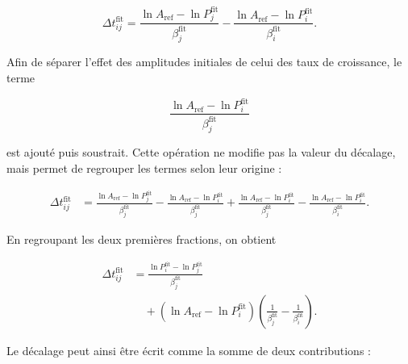 \documentclass[
    11pt,
    a4paper
]{article}
\begin{document}
\begin{equation}
    \Delta t_{ij}^{\mathrm{fit}}
    =
    \frac{
        \ln A_{\mathrm{ref}}
        -
        \ln P_j^{\mathrm{fit}}
    }{
        \beta_j^{\mathrm{fit}}
    }
    -
    \frac{
        \ln A_{\mathrm{ref}}
        -
        \ln P_i^{\mathrm{fit}}
    }{
        \beta_i^{\mathrm{fit}}
    }.
    \label{eq:dt-fit-general-rappel}
\end{equation}

Afin de séparer l’effet des amplitudes initiales de celui des taux de
croissance, le terme

\begin{equation}
    \frac{
        \ln A_{\mathrm{ref}}
        -
        \ln P_i^{\mathrm{fit}}
    }{
        \beta_j^{\mathrm{fit}}
    }
\end{equation}

est ajouté puis soustrait. Cette opération ne modifie pas la valeur du
décalage, mais permet de regrouper les termes selon leur origine :

\begin{align}
    \Delta t_{ij}^{\mathrm{fit}}
    &=
    \frac{
        \ln A_{\mathrm{ref}}
        -
        \ln P_j^{\mathrm{fit}}
    }{
        \beta_j^{\mathrm{fit}}
    }
    -
    \frac{
        \ln A_{\mathrm{ref}}
        -
        \ln P_i^{\mathrm{fit}}
    }{
        \beta_j^{\mathrm{fit}}
    }
    +
    \frac{
        \ln A_{\mathrm{ref}}
        -
        \ln P_i^{\mathrm{fit}}
    }{
        \beta_j^{\mathrm{fit}}
    }
    -
    \frac{
        \ln A_{\mathrm{ref}}
        -
        \ln P_i^{\mathrm{fit}}
    }{
        \beta_i^{\mathrm{fit}}}.
    \label{eq:dt-fit-ajout-soustraction}
\end{align}

En regroupant les deux premières fractions, on obtient

\begin{align}
    \Delta t_{ij}^{\mathrm{fit}}
    &=
    \frac{
        \ln P_i^{\mathrm{fit}}
        -
        \ln P_j^{\mathrm{fit}}
    }{
        \beta_j^{\mathrm{fit}}
    }
    \nonumber\\
    &\quad+
    \left(
        \ln A_{\mathrm{ref}}
        -
        \ln P_i^{\mathrm{fit}}
    \right)
    \left(
        \frac{1}{\beta_j^{\mathrm{fit}}}
        -
        \frac{1}{\beta_i^{\mathrm{fit}}}
    \right).
    \label{eq:decomposition-dt-fit}
\end{align}

Le décalage peut ainsi être écrit comme la somme de deux contributions :
\end{document}
